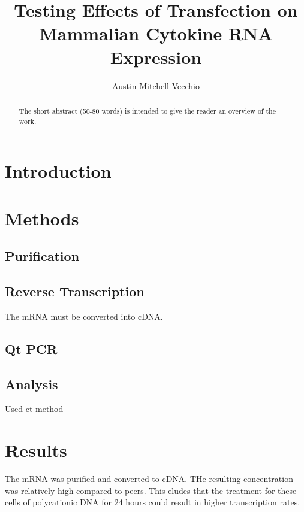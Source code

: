 \documentclass[journal, a4paper]{IEEEtran}
\begin{document}
    \title{Testing Effects of Transfection on Mammalian Cytokine RNA Expression}
    \author{Austin Mitchell Vecchio}
    \maketitle

\begin{abstract}
    The short abstract (50-80 words) is intended to give the reader an overview of the work.
\end{abstract}

\section{Introduction}

\section{Methods}
    \subsection{Purification}
    \subsection{Reverse Transcription}
      The mRNA must be converted into cDNA.
    \subsection{Qt PCR}
    \subsection{Analysis}
        Used \Delta \Delta ct method

\section{Results}
  The mRNA was purified and converted to cDNA. THe resulting concentration was relatively high compared to peers. This eludes that the treatment for these cells of polycationic DNA for 24 hours could result in higher transcription rates.
\end{document}
